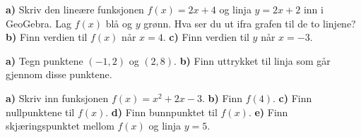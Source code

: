 




\nes

\textbf{a)} Skriv den lineære funksjonen $ {f(x)=2x+4} $ og linja $ {y=2x+2} $ inn i GeoGebra. Lag $ f(x) $ blå og $ y $ grønn. Hva ser du ut ifra grafen til de to linjene?\bs
\textbf{b)} Finn verdien til $ f(x) $ når $ {x=4} $.\bs
\textbf{c)} Finn verdien til $ y $ når $ {x=-3} $.\vsk

\textbf{a)} Tegn punktene $ (-1,2) $ og $ (2,8) $.\bs
\textbf{b)} Finn uttrykket til linja som går gjennom disse punktene.\vsk

\textbf{a)} Skriv inn funksjonen $ {f(x)=x^2+2x-3} $.\bs
\textbf{b)} Finn $ f(4) $.\bs
\textbf{c)} Finn nullpunktene til $ f(x) $.\bs
\textbf{d)} Finn bunnpunktet til $ f(x) $.\bs
\textbf{e)} Finn skjæringspunktet mellom $ f(x) $ og linja $ y=5 $.





